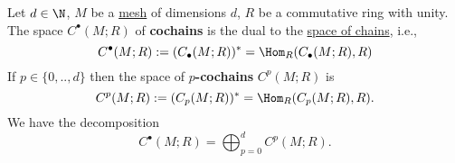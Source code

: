 \begin{definition}
  Let
    $d \in \N$,
    $M$ be a \hyperref[idec:mesh:definition]{mesh} of dimensions $d$,
    $R$ be a commutative ring with unity.
  The space $C^\bullet(M; R)$ of \textbf{cochains} is the dual to the
  \hyperref[idec:mesh_chain:definition]{space of chains}, i.e.,
  \begin{equation}
    C^\bullet(M; R) := (C_\bullet(M; R))^* = \Hom_R(C_\bullet(M; R), R)
  \end{equation}
  If $p \in \{0, .., d\}$ then the space of \textbf{$p$-cochains} $C^p(M; R)$ is
  \begin{equation}
    C^p(M; R) := (C_p(M; R))^* = \Hom_R(C_p(M; R), R).
  \end{equation}
  We have the decomposition
  \begin{equation}
    C^\bullet(M; R) = \bigoplus_{p = 0}^d C^p(M; R).
  \end{equation}
\end{definition}
